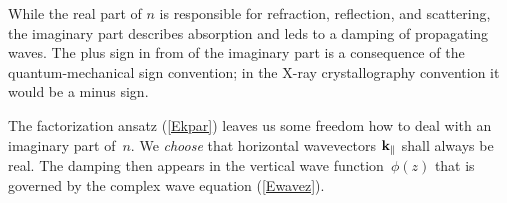 While the real part of $n$ is responsible for refraction, reflection,
and scattering,
the imaginary part describes absorption
and leds to a damping of propagating waves.
The plus sign in from of the imaginary part is a consequence of
the quantum-mechanical sign convention;
in the X-ray crystallography convention it would be a minus sign.
%

The factorization ansatz (\ref{Ekpar}) leaves us some freedom
how to deal with an imaginary part of~$n$.
We \textit{choose} that horizontal wavevectors $\mathbf{k}_\parallel$
shall always be real.
The damping then appears in the vertical wave function~$\phi(z)$
that is governed by the complex wave equation (\ref{Ewavez}).

